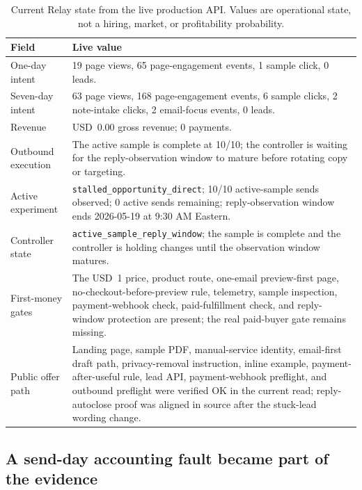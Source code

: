 \documentclass[12pt,letterpaper]{article}
\begin{document}
\begin{table}[tbp]
\centering
\small
\caption{Current Relay state from the live production API. Values are operational state, not a hiring, market, or profitability probability.}
\label{tab:current_state}
\begin{tabularx}{\textwidth}{L{0.27\textwidth}Y}
\toprule
{}
\textbf{Field} & \textbf{Live value} \\
\midrule
One-day intent & 19 page views, 65 page-engagement events, 1 sample click, 0 leads. \\
Seven-day intent & 63 page views, 168 page-engagement events, 6 sample clicks, 2 note-intake clicks, 2 email-focus events, 0 leads. \\
Revenue & USD~0.00 gross revenue; 0 payments. \\
Outbound execution & The active sample is complete at 10/10; the controller is waiting for the reply-observation window to mature before rotating copy or targeting. \\
Active experiment & \texttt{stalled\_opportunity\_direct}; 10/10 active-sample sends observed; 0 active sends remaining; reply-observation window ends 2026-05-19 at 9:30 AM Eastern. \\
Controller state & \texttt{active\_sample\_reply\_window}; the sample is complete and the controller is holding changes until the observation window matures. \\
First-money gates & The USD~1 price, product route, one-email preview-first page, no-checkout-before-preview rule, telemetry, sample inspection, payment-webhook check, paid-fulfillment check, and reply-window protection are present; the real paid-buyer gate remains missing. \\
Public offer path & Landing page, sample PDF, manual-service identity, email-first draft path, privacy-removal instruction, inline example, payment-after-useful rule, lead API, payment-webhook preflight, and outbound preflight were verified OK in the current read; reply-autoclose proof was aligned in source after the stuck-lead wording change. \\
\bottomrule
\end{tabularx}
\end{table}

\subsection{A send-day accounting fault became part of the evidence}
\end{document}
